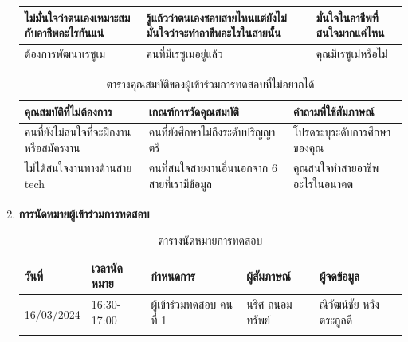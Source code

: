 \begin{enumerate}
\begin{table}[H]
\begin{tabularx}{\textwidth}{|X|X|X|}
                  ไม่มั่นใจว่าตนเองเหมาะสมกับอาชีพอะไรกันแน่   & รู้แล้วว่าตนเองชอบสายไหนแต่ยังไม่มั่นใจว่าจะทำอาชีพอะไรในสายนั้น                         & มั่นใจในอาชีพที่สนใจมากแค่ไหน                                                            \\ \hline
                  ต้องการพัฒนาเรซูเม                      & คนที่มีเรซูเมอยู่แล้ว                                                             & คุณมีเรซูเม่หรือไม่                                                                      \\ \hline
              \end{tabularx}
          \end{table}
          \begin{table}[H]
              \caption{ตารางคุณสมบัติของผู้เข้าร่วมการทดสอบที่ไม่อยากได้}
              \label{tab:excludeUT}
              \begin{tabularx}{\textwidth}{|X|X|X|}
                  \hline
                  \textbf{คุณสมบัติที่ไม่ต้องการ} & \textbf{เกณฑ์การวัดคุณสมบัติ} & \textbf{คำถามที่ใช้สัมภาษณ์} \\ \hline
                  คนที่ยังไม่สนใจที่จะฝึกงานหรือสมัครงาน        & คนที่ยังศึกษาไม่ถึงระดับปริญญาตรี                                                   & โปรดระบุระดับการศึกษาของคุณ                                                            \\ \hline
                  ไม่ได้สนใจงานทางด้านสาย tech            & คนที่สนใจสายงานอื่นนอกจาก 6 สายที่เรามีข้อมูล                                       & คุณสนใจทำสายอาชีพอะไรในอนาคต                                                          \\ \hline
              \end{tabularx}
          \end{table}
    \item \textbf{การนัดหมายผู้เข้าร่วมการทดสอบ}
          \begin{table}[H]
              \caption{ตารางนัดหมายการทดสอบ}
              \label{tab:schedule-UT}
              \begin{tabular}{|r|l|l|l|l|}
                  \hline
                  \multicolumn{1}{|l|}{\textbf{วันที่}} & \textbf{เวลานัดหมาย} & \textbf{กำหนดการ}   & \textbf{ผู้สัมภาษณ์} & \textbf{ผู้จดข้อมูล}            \\ \hline
                  \multirow[t]{5}{*}{16/03/2024}     & 16:30-17:00         & ผู้เข้าร่วมทดสอบ คนที่ 1 & นริศ ถนอมทรัพย์     & ณิวัฒน์ชัย หวังตระกูลดี            \\ \cline{2-5}

\end{tabular}
\end{table}
\end{enumerate}
